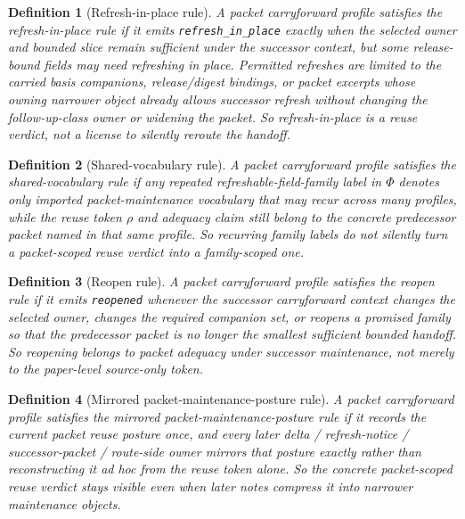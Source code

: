 \documentclass[11pt]{article}
\newtheorem{definition}{Definition}
\begin{document}
\begin{definition}[Refresh-in-place rule]
A packet carryforward profile satisfies the \emph{refresh-in-place rule} if it emits \texttt{refresh\_in\_place} exactly when the selected owner and bounded slice remain sufficient under the successor context, but some release-bound fields may need refreshing in place.
Permitted refreshes are limited to the carried basis companions, release/digest bindings, or packet excerpts whose owning narrower object already allows successor refresh without changing the follow-up-class owner or widening the packet.
So refresh-in-place is a reuse verdict, not a license to silently reroute the handoff.
\end{definition}

\begin{definition}[Shared-vocabulary rule]
A packet carryforward profile satisfies the \emph{shared-vocabulary rule} if any repeated refreshable-field-family label in $\Phi$ denotes only imported packet-maintenance vocabulary that may recur across many profiles, while the reuse token $\rho$ and adequacy claim still belong to the concrete predecessor packet named in that same profile.
So recurring family labels do not silently turn a packet-scoped reuse verdict into a family-scoped one.
\end{definition}

\begin{definition}[Reopen rule]
A packet carryforward profile satisfies the \emph{reopen rule} if it emits \texttt{reopened} whenever the successor carryforward context changes the selected owner, changes the required companion set, or reopens a promised family so that the predecessor packet is no longer the smallest sufficient bounded handoff.
So reopening belongs to packet adequacy under successor maintenance, not merely to the paper-level source-only token.
\end{definition}

\begin{definition}[Mirrored packet-maintenance-posture rule]
A packet carryforward profile satisfies the \emph{mirrored packet-maintenance-posture rule} if it records the current packet reuse posture once, and every later delta / refresh-notice / successor-packet / route-side owner mirrors that posture exactly rather than reconstructing it ad hoc from the reuse token alone.
So the concrete packet-scoped reuse verdict stays visible even when later notes compress it into narrower maintenance objects.
\end{definition}
\end{document}
